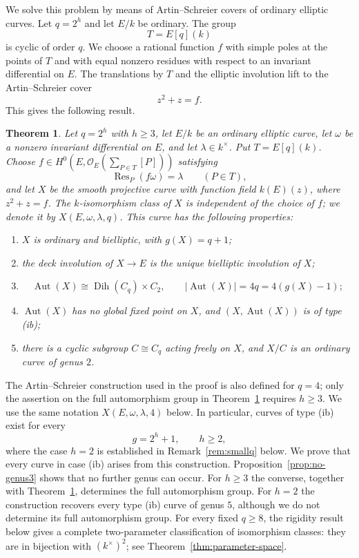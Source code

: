 \documentclass[11pt]{article}
\newtheorem{theorem}{Theorem}[section]
\theoremstyle{remark}
\newcommand{\Aut}{\operatorname{Aut}}
\newcommand{\Res}{\operatorname{Res}}
\newcommand{\Dih}{\operatorname{Dih}}
\begin{document}
We solve this problem by means of Artin--Schreier covers of ordinary
elliptic curves.  Let $q=2^h$ and let $E/k$ be ordinary.  The group
\[
        T=E[q](k)
\]
is cyclic of order $q$.  We choose a rational function $f$ with simple
poles at the points of $T$ and with equal nonzero residues with respect
to an invariant differential on $E$.  The translations by $T$ and the
elliptic involution lift to the Artin--Schreier cover
\[
        z^2+z=f.
\]
This gives the following result.


\begin{theorem}\label{thm:main}
Let $q=2^h$ with $h\ge3$, let $E/k$ be an ordinary elliptic curve, let
$\omega$ be a nonzero invariant differential on $E$, and let
$\lambda\in k^\times$.  Put $T=E[q](k)$.  Choose
$f\in H^0(E,\mathcal O_E(\sum_{P\in T}[P]))$ satisfying
\[
        \Res_P(f\omega)=\lambda\qquad(P\in T),
\]
and let $X$ be the smooth projective curve with function field
$k(E)(z)$, where $z^2+z=f$.  The $k$-isomorphism class of $X$ is
independent of the choice of $f$; we denote it by
$X(E,\omega,\lambda,q)$.  This curve has the following properties:
\begin{enumerate}[label=\textup{(\roman*)}]
\item $X$ is ordinary and bielliptic, with $g(X)=q+1$;
\item the deck involution of $X\to E$ is the unique bielliptic
involution of $X$;
\item
\[
        \Aut(X)\cong \Dih(C_q)\times C_2,
        \qquad
        |\Aut(X)|=4q=4(g(X)-1);
\]
\item $\Aut(X)$ has no global fixed point on $X$, and
$(X,\Aut(X))$ is of type \textup{(ib)};
\item there is a cyclic subgroup $C\cong C_q$ acting freely on $X$, and
$X/C$ is an ordinary curve of genus $2$.
\end{enumerate}
\end{theorem}


The Artin--Schreier construction used in the proof is also defined for
$q=4$; only the assertion on the full automorphism group in
Theorem~\ref{thm:main} requires $h\ge3$.  We use the same notation
$X(E,\omega,\lambda,4)$ below.  In particular, curves of type
\textup{(ib)} exist for every
\[
        g=2^h+1,\qquad h\ge2,
\]
where the case $h=2$ is established in Remark~\ref{rem:smallq} below.
We prove that every curve in case \textup{(ib)} arises from this
construction.  Proposition~\ref{prop:no-genus3} shows that no further
genus can occur.  For $h\ge3$ the converse, together with
Theorem~\ref{thm:main}, determines the full automorphism group.  For
$h=2$ the construction recovers every type \textup{(ib)} curve of genus
$5$, although we do not determine its full automorphism group.  For every
fixed $q\ge8$, the rigidity result below gives a complete two-parameter
classification of isomorphism classes: they are in bijection with
$(k^\times)^2$; see Theorem~\ref{thm:parameter-space}.
\end{document}
